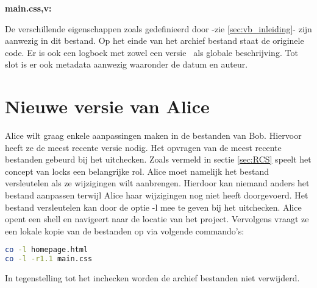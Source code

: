 \textbf{main.css,v:}


De verschillende eigenschappen zoals gedefinieerd door \textcite{Loeliger2009} -zie \ref{sec:vb_inleiding}- zijn aanwezig in dit bestand. Op het einde van het archief bestand staat de originele code. Er is ook een logboek met zowel een versie~ als globale beschrijving. Tot slot is er ook metadata aanwezig waaronder de datum en auteur.

\section{Nieuwe versie van Alice}

Alice wilt graag enkele aanpassingen maken in de bestanden van Bob. Hiervoor heeft ze de meest recente versie nodig. Het opvragen van de meest recente bestanden gebeurd bij het uitchecken. Zoals vermeld in sectie \ref{sec:RCS} speelt het concept van locks een belangrijke rol. Alice moet namelijk het bestand versleutelen als ze wijzigingen wilt aanbrengen. Hierdoor kan niemand anders het bestand aanpassen terwijl Alice haar wijzigingen nog niet heeft doorgevoerd. Het bestand versleutelen kan door de optie -l mee te geven bij het uitchecken. Alice opent een shell en navigeert naar de locatie van het project. Vervolgens vraagt ze een lokale kopie van de bestanden op via volgende commando's:

\begin{lstlisting}[language=Bash]
co -l homepage.html
co -l -r1.1 main.css
\end{lstlisting}

In tegenstelling tot het inchecken worden de archief bestanden niet verwijderd.